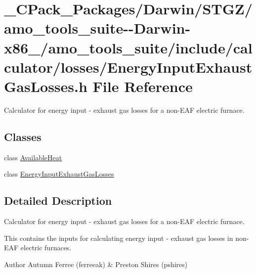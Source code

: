 \hypertarget{___c_pack___packages_2_darwin_2_s_t_g_z_2amo__tools__suite--_darwin-x86__64_2amo__tools__suite_292e6f95923a64cc06827649b8f64f80c}{}\section{\+\_\+\+C\+Pack\+\_\+\+Packages/\+Darwin/\+S\+T\+G\+Z/amo\+\_\+tools\+\_\+suite-\/-\/\+Darwin-\/x86\+\_/amo\+\_\+tools\+\_\+suite/include/calculator/losses/\+Energy\+Input\+Exhaust\+Gas\+Losses.h File Reference}
\label{___c_pack___packages_2_darwin_2_s_t_g_z_2amo__tools__suite--_darwin-x86__64_2amo__tools__suite_292e6f95923a64cc06827649b8f64f80c}


Calculator for energy input -\/ exhaust gas losses for a non-\/\+E\+AF electric furnace.  


\subsection*{Classes}
\begin{DoxyCompactItemize}
\item 
class \hyperlink{class_available_heat}{Available\+Heat}
\item 
class \hyperlink{class_energy_input_exhaust_gas_losses}{Energy\+Input\+Exhaust\+Gas\+Losses}
\end{DoxyCompactItemize}


\subsection{Detailed Description}
Calculator for energy input -\/ exhaust gas losses for a non-\/\+E\+AF electric furnace. 

This contains the inputs for calculating energy input -\/ exhaust gas losses in non-\/\+E\+AF electric furnaces.

\begin{DoxyAuthor}{Author}
Autumn Ferree (ferreeak) \& Preston Shires (pshires) 
\end{DoxyAuthor}
